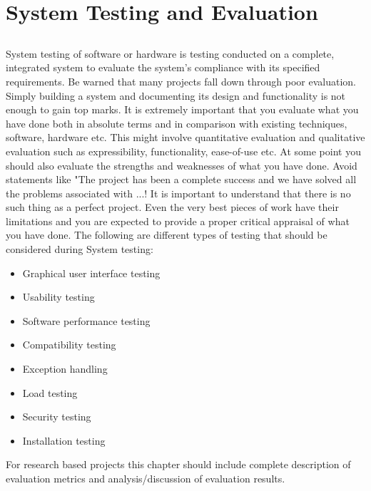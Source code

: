 \chapter{System Testing and Evaluation}\label{chap:testingEvaluation}


\section*{}
System testing of software or hardware is testing conducted on a complete, integrated system to evaluate the system's compliance with its specified requirements. Be warned that many projects fall down through poor evaluation. Simply building a system and documenting its design and functionality is not enough to gain top marks. It is extremely important that you evaluate what you have done both in absolute terms and in comparison with existing techniques, software, hardware etc. This might involve quantitative evaluation and qualitative evaluation such as expressibility, functionality, ease-of-use etc. At some point you should also evaluate the strengths and weaknesses of what you have done. Avoid statements like "The project has been a complete success and we have solved all the problems associated with ...! It is important to understand that there is no such thing as a perfect project. Even the very best pieces of work have their limitations and you are expected to provide a proper critical appraisal of what you have done. The following are different types of testing that should be considered during System testing:

\begin{itemize}
	\item Graphical user interface testing
	\item Usability testing
	\item Software performance testing
	\item Compatibility testing
	\item Exception handling
	\item Load testing
	\item Security testing
	\item Installation testing
\end{itemize}

For research based projects this chapter should include complete description of evaluation metrics and analysis/discussion of evaluation results.

